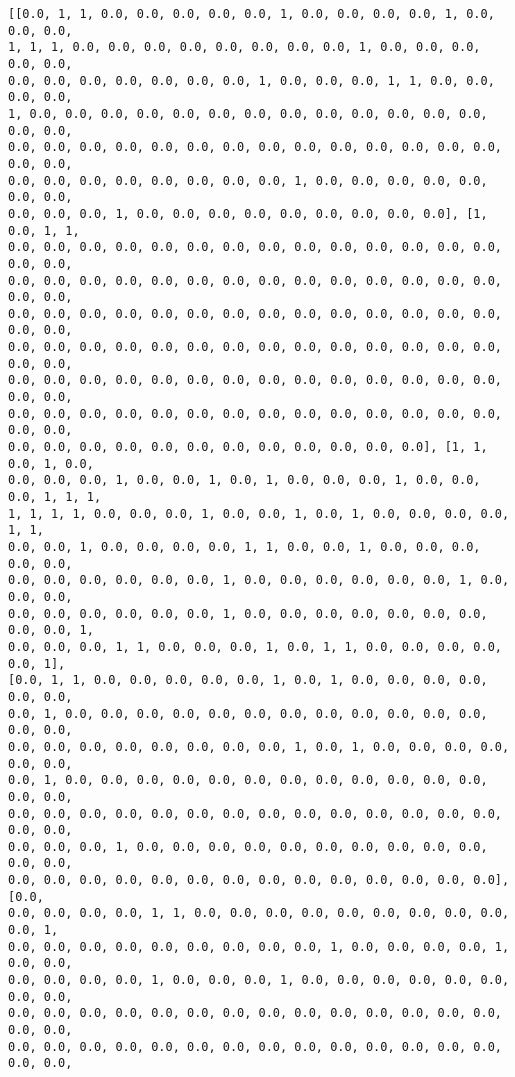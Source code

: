 \documentclass[11pt]{article}
\begin{document}
    \begin{Verbatim}[commandchars=\\\{\}]
[[0.0, 1, 1, 0.0, 0.0, 0.0, 0.0, 0.0, 1, 0.0, 0.0, 0.0, 0.0, 1, 0.0, 0.0, 0.0,
1, 1, 1, 0.0, 0.0, 0.0, 0.0, 0.0, 0.0, 0.0, 0.0, 1, 0.0, 0.0, 0.0, 0.0, 0.0,
0.0, 0.0, 0.0, 0.0, 0.0, 0.0, 0.0, 1, 0.0, 0.0, 0.0, 1, 1, 0.0, 0.0, 0.0, 0.0,
1, 0.0, 0.0, 0.0, 0.0, 0.0, 0.0, 0.0, 0.0, 0.0, 0.0, 0.0, 0.0, 0.0, 0.0, 0.0,
0.0, 0.0, 0.0, 0.0, 0.0, 0.0, 0.0, 0.0, 0.0, 0.0, 0.0, 0.0, 0.0, 0.0, 0.0, 0.0,
0.0, 0.0, 0.0, 0.0, 0.0, 0.0, 0.0, 0.0, 1, 0.0, 0.0, 0.0, 0.0, 0.0, 0.0, 0.0,
0.0, 0.0, 0.0, 1, 0.0, 0.0, 0.0, 0.0, 0.0, 0.0, 0.0, 0.0, 0.0], [1, 0.0, 1, 1,
0.0, 0.0, 0.0, 0.0, 0.0, 0.0, 0.0, 0.0, 0.0, 0.0, 0.0, 0.0, 0.0, 0.0, 0.0, 0.0,
0.0, 0.0, 0.0, 0.0, 0.0, 0.0, 0.0, 0.0, 0.0, 0.0, 0.0, 0.0, 0.0, 0.0, 0.0, 0.0,
0.0, 0.0, 0.0, 0.0, 0.0, 0.0, 0.0, 0.0, 0.0, 0.0, 0.0, 0.0, 0.0, 0.0, 0.0, 0.0,
0.0, 0.0, 0.0, 0.0, 0.0, 0.0, 0.0, 0.0, 0.0, 0.0, 0.0, 0.0, 0.0, 0.0, 0.0, 0.0,
0.0, 0.0, 0.0, 0.0, 0.0, 0.0, 0.0, 0.0, 0.0, 0.0, 0.0, 0.0, 0.0, 0.0, 0.0, 0.0,
0.0, 0.0, 0.0, 0.0, 0.0, 0.0, 0.0, 0.0, 0.0, 0.0, 0.0, 0.0, 0.0, 0.0, 0.0, 0.0,
0.0, 0.0, 0.0, 0.0, 0.0, 0.0, 0.0, 0.0, 0.0, 0.0, 0.0, 0.0], [1, 1, 0.0, 1, 0.0,
0.0, 0.0, 0.0, 1, 0.0, 0.0, 1, 0.0, 1, 0.0, 0.0, 0.0, 1, 0.0, 0.0, 0.0, 1, 1, 1,
1, 1, 1, 1, 0.0, 0.0, 0.0, 1, 0.0, 0.0, 1, 0.0, 1, 0.0, 0.0, 0.0, 0.0, 1, 1,
0.0, 0.0, 1, 0.0, 0.0, 0.0, 0.0, 1, 1, 0.0, 0.0, 1, 0.0, 0.0, 0.0, 0.0, 0.0,
0.0, 0.0, 0.0, 0.0, 0.0, 0.0, 1, 0.0, 0.0, 0.0, 0.0, 0.0, 0.0, 1, 0.0, 0.0, 0.0,
0.0, 0.0, 0.0, 0.0, 0.0, 0.0, 1, 0.0, 0.0, 0.0, 0.0, 0.0, 0.0, 0.0, 0.0, 0.0, 1,
0.0, 0.0, 0.0, 1, 1, 0.0, 0.0, 0.0, 1, 0.0, 1, 1, 0.0, 0.0, 0.0, 0.0, 0.0, 1],
[0.0, 1, 1, 0.0, 0.0, 0.0, 0.0, 0.0, 1, 0.0, 1, 0.0, 0.0, 0.0, 0.0, 0.0, 0.0,
0.0, 1, 0.0, 0.0, 0.0, 0.0, 0.0, 0.0, 0.0, 0.0, 0.0, 0.0, 0.0, 0.0, 0.0, 0.0,
0.0, 0.0, 0.0, 0.0, 0.0, 0.0, 0.0, 0.0, 1, 0.0, 1, 0.0, 0.0, 0.0, 0.0, 0.0, 0.0,
0.0, 1, 0.0, 0.0, 0.0, 0.0, 0.0, 0.0, 0.0, 0.0, 0.0, 0.0, 0.0, 0.0, 0.0, 0.0,
0.0, 0.0, 0.0, 0.0, 0.0, 0.0, 0.0, 0.0, 0.0, 0.0, 0.0, 0.0, 0.0, 0.0, 0.0, 0.0,
0.0, 0.0, 0.0, 1, 0.0, 0.0, 0.0, 0.0, 0.0, 0.0, 0.0, 0.0, 0.0, 0.0, 0.0, 0.0,
0.0, 0.0, 0.0, 0.0, 0.0, 0.0, 0.0, 0.0, 0.0, 0.0, 0.0, 0.0, 0.0, 0.0], [0.0,
0.0, 0.0, 0.0, 0.0, 1, 1, 0.0, 0.0, 0.0, 0.0, 0.0, 0.0, 0.0, 0.0, 0.0, 0.0, 1,
0.0, 0.0, 0.0, 0.0, 0.0, 0.0, 0.0, 0.0, 0.0, 1, 0.0, 0.0, 0.0, 0.0, 1, 0.0, 0.0,
0.0, 0.0, 0.0, 0.0, 1, 0.0, 0.0, 0.0, 1, 0.0, 0.0, 0.0, 0.0, 0.0, 0.0, 0.0, 0.0,
0.0, 0.0, 0.0, 0.0, 0.0, 0.0, 0.0, 0.0, 0.0, 0.0, 0.0, 0.0, 0.0, 0.0, 0.0, 0.0,
0.0, 0.0, 0.0, 0.0, 0.0, 0.0, 0.0, 0.0, 0.0, 0.0, 0.0, 0.0, 0.0, 0.0, 0.0, 0.0,

\end{Verbatim}
\end{document}
